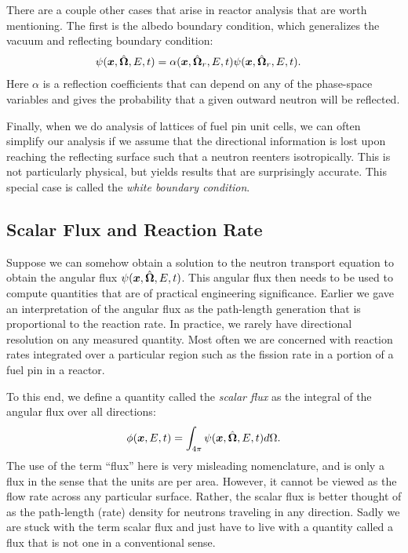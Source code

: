 There are a couple other cases that arise in reactor analysis that are worth mentioning. The first is the albedo boundary condition, which generalizes the vacuum and reflecting boundary condition:
\begin{align}
  \psi(\bm{x},\hat{\mathbf{\Omega}},E,t) &= \alpha( \bm{x}, \hat{\mathbf{\Omega}}_r, E, t ) \psi(\bm{x},\hat{\mathbf{\Omega}}_r,E,t) .
\end{align}
Here $\alpha$ is a reflection coefficients that can depend on any of the phase-space variables and gives the probability that a given outward neutron will be reflected. 

Finally, when we do analysis of lattices of fuel pin unit cells, we can often simplify our analysis if we assume that the directional information is lost upon reaching the reflecting surface such that a neutron reenters isotropically. This is not particularly physical, but yields results that are surprisingly accurate. This special case is called the \emph{white boundary condition}.

\subsection{Scalar Flux and Reaction Rate}

Suppose we can somehow obtain a solution to the neutron transport equation to obtain the angular flux $\psi(\bm{x},\hat{\mathbf{\Omega}},E,t)$. This angular flux then needs to be used to compute quantities that are of practical engineering significance. Earlier we gave an interpretation of the angular flux as the path-length generation that is proportional to the reaction rate. In practice, we rarely have directional resolution on any measured quantity. Most often we are concerned with reaction rates integrated over a particular region such as the fission rate in a portion of a fuel pin in a reactor.

To this end, we define a quantity called the \emph{scalar flux} as the integral of the angular flux over all directions:
\begin{align}
  \phi(\bm{x},E,t) = \int_{4\pi} \psi(\bm{x},\hat{\mathbf{\Omega}},E,t) d\Omega.
\end{align}
The use of the term ``flux'' here is very misleading nomenclature, and is only a flux in the sense that the units are per area. However, it cannot be viewed as the flow rate across any particular surface. Rather, the scalar flux is better thought of as the path-length (rate) density for neutrons traveling in any direction. Sadly we are stuck with the term scalar flux and just have to live with a quantity called a flux that is not one in a conventional sense.

